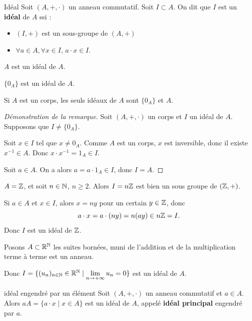 \lvspace \avspace \begin{definition}{Idéal}{}
    Soit $(A, +, \cdot)$ un anneau commutatif. Soit $I \subset A$. On dit que $I$ est un \textbf{idéal} de $A$ ssi :
    \begin{itemize}
        \item $(I, +)$ est un sous-groupe de $(A, +)$ 
        \item $\forall a \in A, \forall x \in I, \, a \cdot x \in I$.
    \end{itemize}
\end{definition}

\begin{exemple}
    $A$ est un idéal de $A$.

    $\{0_A\}$ est un idéal de $A$.
\end{exemple}

\begin{remarque}
    Si $A$ est un corps, les seuls idéaux de $A$ sont $\{0_A\}$ et $A$.
\end{remarque}

\begin{proof}[Démonstration de la remarque]

    Soit $(A, +, \cdot)$ un corps et $I$ un idéal de $A$. Supposons que $I \neq \{0_A\}$.

    Soit $x \in I$ tel que $x \neq 0_A$. Comme $A$ est un corps, $x$ est inversible, donc
    il existe $x^{-1} \in A$. Donc $x \cdot x^{-1} = 1_A \in I$.

    Soit $a \in A$. On a alors $a = a \cdot 1_A \in I$, donc $I = A$.
\end{proof}

\begin{exemple}
    $A = \mathbb{Z}$, et soit $n \in \mathbb{N}$, $n \geqslant 2$. Alors $I = n\mathbb{Z}$ est bien un sous groupe de $(\mathbb{Z}, +)$.

    Si $a \in A$ et $x \in I$, alors $x = ny$ pour un certain $y \in \mathbb{Z}$, donc
    \[
        a \cdot x = a \cdot (ny) = n(ay) \in n\mathbb{Z} = I.
    \]
    Donc $I$ est un idéal de $\mathbb{Z}$.

    \lvspace Posons $A \subset \mathbb{R}^{\mathbb{N}}$ les suites bornées, muni de l'addition et de la multiplication terme à terme
    est un anneau.

    Donc $I = \{(u_n)_{n \in \mathbb{N}} \in \mathbb{R}^{\mathbb{N}} \mid \lim\limits_{n \to +\infty} u_n = 0\}$ est un idéal de $A$.


\end{exemple}

\begin{theoreme}{idéal engendré par un élément}{}
    Soit $(A, +, \cdot)$ un anneau commutatif et $a \in A$. Alors
    $aA = \{a \cdot x \mid x \in A\}$ est un idéal de $A$, appelé
    \textbf{idéal principal} engendré par $a$.
    
\end{theoreme}

